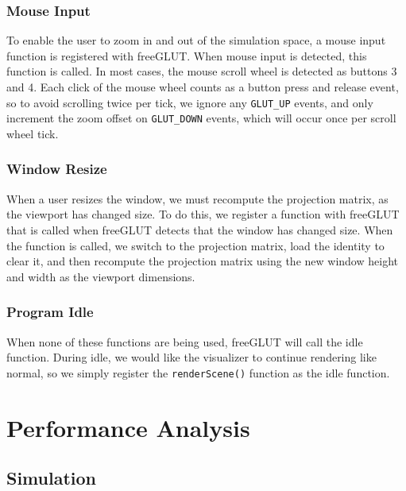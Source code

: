 \documentclass[fleqn,10pt]{UserGuideArx} %
\begin{document}
\subsubsection{Mouse Input}
    To enable the user to zoom in and out of the simulation space, a mouse input function is registered with freeGLUT. When mouse input is detected, this function is called. In most cases, the mouse scroll wheel is detected as buttons 3 and 4. Each click of the mouse wheel counts as a button press and release event, so to avoid scrolling twice per tick, we ignore any \texttt{GLUT\_UP} events, and only increment the zoom offset on \texttt{GLUT\_DOWN} events, which will occur once per scroll wheel tick.\\
     
\subsubsection{Window Resize}
    When a user resizes the window, we must recompute the projection matrix, as the viewport has changed size. To do this, we register a function with freeGLUT that is called when freeGLUT detects that the window has changed size. When the function is called, we switch to the projection matrix, load the identity to clear it, and then recompute the projection matrix using the new window height and width as the viewport dimensions.\\
    
\subsubsection{Program Idle}
    When none of these functions are being used, freeGLUT will call the idle function. During idle, we would like the visualizer to continue rendering like normal, so we simply register the \texttt{renderScene()} function as the idle function.\\

\section{Performance Analysis}
\subsection{Simulation}
\end{document}

